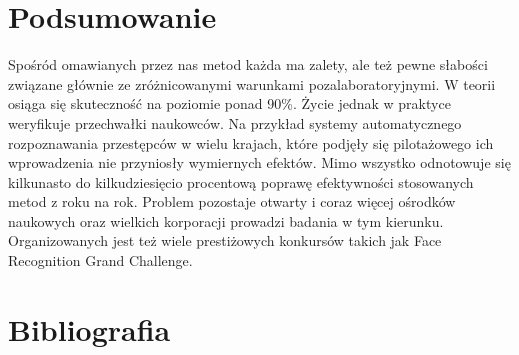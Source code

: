 \documentclass[11pt,a4paper]{article}
\begin{document}
\section{Podsumowanie}

Spośród omawianych przez nas metod każda ma zalety, ale też pewne słabości związane głównie ze zróżnicowanymi warunkami pozalaboratoryjnymi. W teorii osiąga się skuteczność na poziomie ponad 90\%. Życie jednak w praktyce weryfikuje przechwałki naukowców. Na przykład systemy automatycznego rozpoznawania przestępców w wielu krajach, które podjęły się pilotażowego ich wprowadzenia nie przyniosły wymiernych efektów. Mimo wszystko odnotowuje się kilkunasto do kilkudziesięcio procentową poprawę efektywności stosowanych metod z roku na rok. Problem pozostaje otwarty i coraz więcej ośrodków naukowych oraz wielkich korporacji prowadzi badania w tym kierunku. Organizowanych jest też wiele prestiżowych konkursów takich jak Face Recognition Grand Challenge.

\section{Bibliografia}



\end{document}
